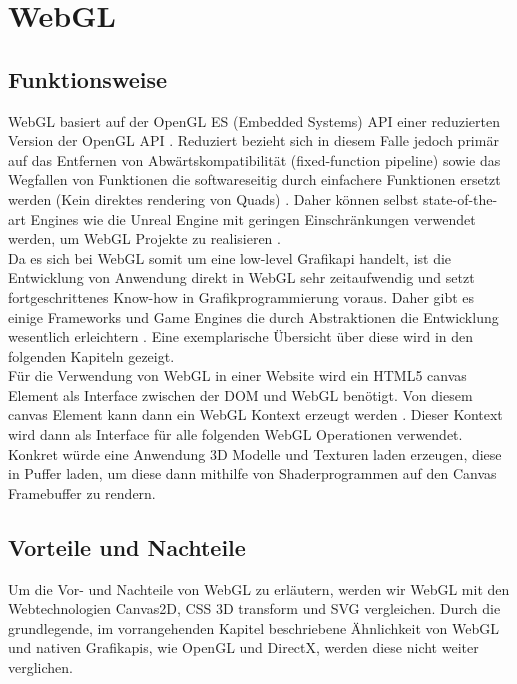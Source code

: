 \section{WebGL}
\subsection{Funktionsweise}
WebGL basiert auf der OpenGL ES (Embedded Systems) API \cite{parisi2012webgl} einer reduzierten Version der OpenGL API \cite{KhronosGLES}. Reduziert bezieht sich in diesem Falle jedoch primär auf das Entfernen von Abwärtskompatibilität (\zb fixed-function pipeline) sowie das Wegfallen von Funktionen die softwareseitig durch einfachere Funktionen ersetzt werden (\zb Kein direktes rendering von Quads) \cite{DiffGLES}. Daher können selbst state-of-the-art Engines wie die Unreal Engine mit geringen Einschränkungen verwendet werden, um WebGL Projekte zu realisieren \cite{UnrealHTML5}\cite{UnrealLimits}. \\
Da es sich bei WebGL somit um eine low-level Grafikapi handelt, ist die Entwicklung von Anwendung direkt in WebGL sehr zeitaufwendig und setzt fortgeschrittenes Know-how in Grafikprogrammierung voraus. Daher gibt es einige Frameworks und Game Engines die durch Abstraktionen die Entwicklung wesentlich erleichtern \cite{parisi2012webgl}. Eine exemplarische Übersicht über diese wird in den folgenden Kapiteln gezeigt. \\
Für die Verwendung von WebGL in einer Website wird ein HTML5 canvas Element als Interface zwischen der \ac{DOM} und WebGL benötigt. Von diesem canvas Element kann dann ein WebGL Kontext erzeugt werden \cite{parisi2012webgl}. Dieser Kontext wird dann als Interface für alle folgenden WebGL Operationen verwendet. Konkret würde eine Anwendung 3D Modelle und Texturen laden \bzw erzeugen, diese in Puffer laden, um diese dann mithilfe von Shaderprogrammen auf den Canvas Framebuffer zu rendern. 
\subsection{Vorteile und Nachteile}
Um die Vor- und Nachteile von WebGL zu erläutern, werden wir WebGL mit den Webtechnologien Canvas2D, CSS 3D transform und SVG vergleichen. Durch die grundlegende, im vorrangehenden Kapitel beschriebene Ähnlichkeit von WebGL und nativen Grafikapis, wie OpenGL und DirectX, werden diese nicht weiter verglichen.

